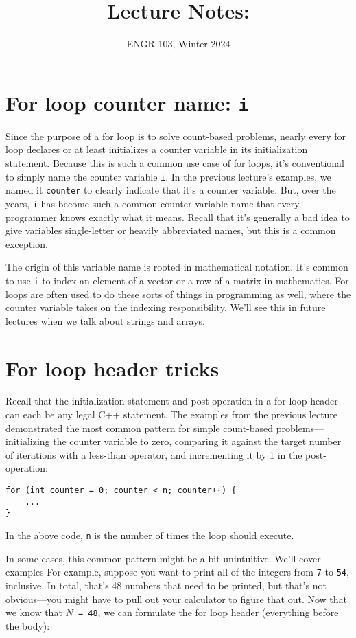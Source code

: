 \documentclass{article}
\title{
    Lecture Notes: \lecturetitle
}
\author{ENGR 103, Winter 2024}
\date{}
\begin{document}
\maketitle

\section{For loop counter name: \texttt{i}}

Since the purpose of a for loop is to solve count-based problems, nearly every for loop declares or at least initializes a counter variable in its initialization statement. Because this is such a common use case of for loops, it's conventional to simply name the counter variable \texttt{i}. In the previous lecture's examples, we named it \texttt{counter} to clearly indicate that it's a counter variable. But, over the years, \texttt{i} has become such a common counter variable name that every programmer knows exactly what it means. Recall that it's generally a bad idea to give variables single-letter or heavily abbreviated names, but this is a common exception.

The origin of this variable name is rooted in mathematical notation. It's common to use \texttt{i} to index an element of a vector or a row of a matrix in mathematics. For loops are often used to do these sorts of things in programming as well, where the counter variable takes on the indexing responsibility. We'll see this in future lectures when we talk about strings and arrays.

\section{For loop header tricks}

Recall that the initialization statement and post-operation in a for loop header can each be any legal C++ statement. The examples from the previous lecture demonstrated the most common pattern for simple count-based problems---initializing the counter variable to zero, comparing it against the target number of iterations with a less-than operator, and incrementing it by 1 in the post-operation:

\begin{verbatim}
for (int counter = 0; counter < n; counter++) {
    ...
}
\end{verbatim}

In the above code, \texttt{n} is the number of times the loop should execute.

In some cases, this common pattern might be a bit unintuitive. We'll cover examples For example, suppose you want to print all of the integers from \texttt{7} to \texttt{54}, inclusive. In total, that's 48 numbers that need to be printed, but that's not obvious---you might have to pull out your calculator to figure that out. Now that we know that \texttt{$N$ = 48}, we can formulate the for loop header (everything before the body):
\end{document}
